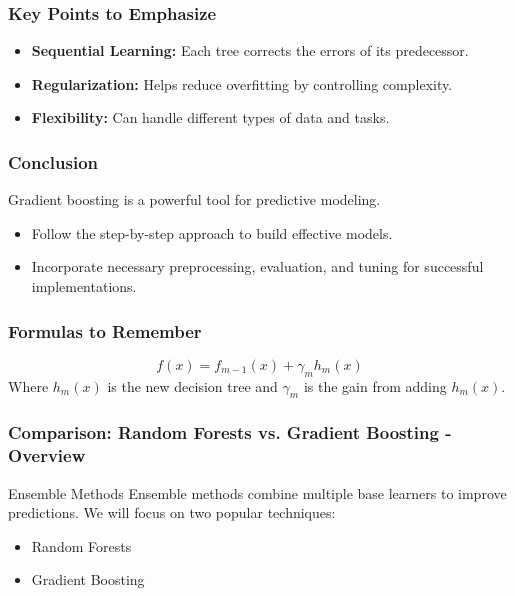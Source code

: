 \documentclass[aspectratio=169]{beamer}
\begin{document}
\begin{frame}
    \frametitle{Key Points to Emphasize}
    \begin{itemize}
        \item \textbf{Sequential Learning:} Each tree corrects the errors of its predecessor.
        \item \textbf{Regularization:} Helps reduce overfitting by controlling complexity.
        \item \textbf{Flexibility:} Can handle different types of data and tasks.
    \end{itemize}
\end{frame}

\begin{frame}
    \frametitle{Conclusion}
    Gradient boosting is a powerful tool for predictive modeling. 
    \begin{itemize}
        \item Follow the step-by-step approach to build effective models.
        \item Incorporate necessary preprocessing, evaluation, and tuning for successful implementations.
    \end{itemize}
\end{frame}

\begin{frame}
    \frametitle{Formulas to Remember}
    \begin{equation}
        f(x) = f_{m-1}(x) + \gamma_m h_m(x)
    \end{equation}
    Where \( h_m(x) \) is the new decision tree and \( \gamma_m \) is the gain from adding \( h_m(x) \).
\end{frame}

\begin{frame}[fragile]
    \frametitle{Comparison: Random Forests vs. Gradient Boosting - Overview}
    \begin{block}{Ensemble Methods}
        Ensemble methods combine multiple base learners to improve predictions. We will focus on two popular techniques: 
        \begin{itemize}
            \item Random Forests
            \item Gradient Boosting
        \end{itemize}
    \end{block}
\end{frame}
\end{document}
